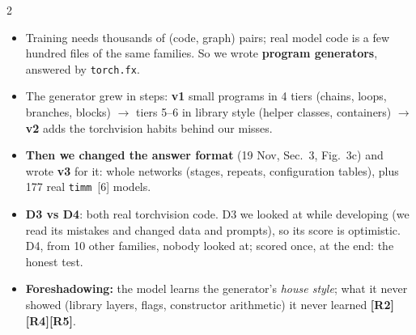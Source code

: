 \documentclass[10pt]{article}
\newcommand{\tg}[1]{\textcolor{tagc}{\textbf{[#1]}}}
\newcommand{\sect}[1]{\vspace{1pt}{\large\bfseries #1}\par}
\begin{document}
\begin{multicols}{2}
\sect{2\quad Data: why we generated our own}
\begin{itemize}
\item Training needs thousands of (code, graph) pairs; real model code is a few hundred files of the same
families. So we wrote \textbf{program generators}, answered by \texttt{torch.fx}.
\item The generator grew in steps: \textbf{v1} small programs in 4 tiers (chains, loops, branches, blocks)
$\rightarrow$ tiers 5--6 in library style (helper classes, containers) $\rightarrow$ \textbf{v2} adds the
torchvision habits behind our misses.
\item \textbf{Then we changed the answer format} (19 Nov, Sec.~3, Fig.~3c) and wrote \textbf{v3} for it: whole
networks (stages, repeats, configuration tables), plus 177 real \texttt{timm}~[6] models.
\item \textbf{D3 vs D4}: both real torchvision code. D3 we looked at while developing (we read its mistakes and
changed data and prompts), so its score is optimistic. D4, from 10 other families, nobody looked at; scored once, at
the end: the honest test.
\item \textbf{Foreshadowing:} the model learns the generator's \emph{house style}; what it never showed
(library layers, flags, constructor arithmetic) it never learned
\tg{R2}\tg{R4}\tg{R5}.
\end{itemize}
\end{multicols}
\vspace{-2pt}
\end{document}
